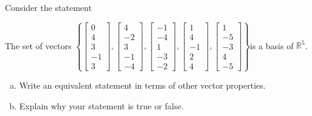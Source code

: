 
\begin{exerciseStatement}


Consider the statement 
\begin{center}\begin{minipage}{0.8\textwidth}
 The set of vectors \( \left\{ \left[\begin{array}{c}
0 \\
4 \\
3 \\
-1 \\
3
\end{array}\right] , \left[\begin{array}{c}
4 \\
-2 \\
3 \\
-1 \\
-4
\end{array}\right] , \left[\begin{array}{c}
-1 \\
-4 \\
1 \\
-3 \\
-2
\end{array}\right] , \left[\begin{array}{c}
1 \\
4 \\
-1 \\
2 \\
4
\end{array}\right] , \left[\begin{array}{c}
1 \\
-5 \\
-3 \\
4 \\
-5
\end{array}\right] \right\} \)is a basis of \(\mathbb{R}^5\). 
\end{minipage}\end{center}
    


\begin{enumerate}[(a)]
\item  Write an equivalent statement in terms of other vector properties.
\item  Explain why your statement is true or false.
\end{enumerate}
    
\end{exerciseStatement}
    
